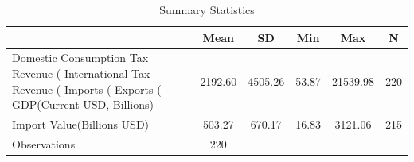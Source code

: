 \begin{table}[htbp]\centering
\def\sym#1{\ifmmode^{#1}\else\(^{#1}\)\fi}
\caption{Summary Statistics \label{tab:sumstat}}
\begin{tabular}{lccccc}
\toprule
                         &    Mean&      SD&     Min&     Max&       N\\
\midrule
Domestic Consumption Tax Revenue (%
International Tax Revenue (%
Imports (%
Exports (%
GDP(Current USD, Billions)& 2192.60& 4505.26&   53.87&21539.98&     220\\
Import Value(Billions USD)&  503.27&  670.17&   16.83& 3121.06&     215\\
\midrule
Observations             &     220&        &        &        &        \\
\bottomrule
\end{tabular}
\end{table}
